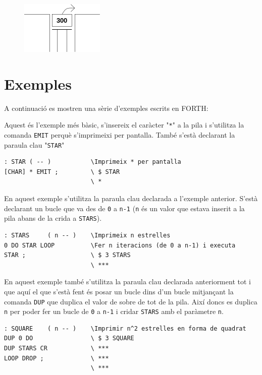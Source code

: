 \documentclass{article}
\begin{document}
\begin{figure}[h!]
\begin{minipage}[b]{0.2\linewidth}
		\caption{}
		\label{fig:stack_3}
	\end{minipage}
	\hfill
	\begin{minipage}[b]{0.2\linewidth}
		\includegraphics[width=\linewidth]{stack_4}
		\caption{}
		\label{fig:stack_4}
	\end{minipage}
\end{figure}

\section{Exemples}
A continuació es mostren una sèrie d'exemples escrits en FORTH\cite{rosettacode}:

Aquest és l'exemple més bàsic, s'insereix el caràcter "\texttt{*}" a la pila i s'utilitza la comanda \texttt{EMIT} perquè s'imprimeixi per pantalla. També s'està declarant la paraula clau "\texttt{STAR}"
\begin{lstlisting}[frame=single]
: STAR ( -- )           \Imprimeix * per pantalla          
[CHAR] * EMIT ;       	\ $ STAR
						\ *
\end{lstlisting}

En aquest exemple s'utilitza la paraula clau declarada a l'exemple anterior. S'està declarant un bucle que va des de \texttt{0} a \texttt{n-1} (\texttt{n} és un valor que estava inserit a la pila abans de la crida a \texttt{STARS}).
\begin{lstlisting}[frame=single]
: STARS     ( n -- )    \Imprimeix n estrelles
0 DO STAR LOOP        	\Fer n iteracions (de 0 a n-1) i executa
STAR ;                	\ $ 3 STARS
						\ ***
\end{lstlisting}

En aquest exemple també s'utilitza la paraula clau declarada anteriorment tot i que aquí el que s'està fent és posar un bucle dins d'un bucle mitjançant la comanda \texttt{DUP} que duplica el valor de sobre de tot de la pila. Així doncs es duplica \texttt{n} per poder fer un bucle de \texttt{0} a \texttt{n-1} i cridar \texttt{STARS} amb el paràmetre \texttt{n}.
\begin{lstlisting}[frame=single]
: SQUARE    ( n -- )    \Imprimir n^2 estrelles en forma de quadrat
DUP 0 DO              	\ $ 3 SQUARE
DUP STARS CR          	\ ***
LOOP DROP ;           	\ ***
						\ ***
\end{lstlisting}
\end{document}
